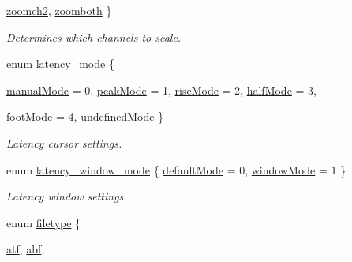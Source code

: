 \begin{DoxyCompactItemize}
\hyperlink{group__stfgen_gga9a792b11c01e9429bfe2acd3e4ef108baef0062d1da678e4771bf559b3dc1e537}{zoomch2}, 
\hyperlink{group__stfgen_gga9a792b11c01e9429bfe2acd3e4ef108ba0c34eab028555c38760abc86b551b6c6}{zoomboth}
 \}
\begin{DoxyCompactList}\small\item\em Determines which channels to scale. \item\end{DoxyCompactList}\item 
enum \hyperlink{group__stfgen_ga738f9934a45a9d2d81cb0a3de0375c99}{latency\_\-mode} \{ \par
\hyperlink{group__stfgen_gga738f9934a45a9d2d81cb0a3de0375c99a38b8edc5f8a706c23b6efd737aada25a}{manualMode} =  0, 
\hyperlink{group__stfgen_gga738f9934a45a9d2d81cb0a3de0375c99a42837a2123b13815fb4ee3c005f2cac0}{peakMode} =  1, 
\hyperlink{group__stfgen_gga738f9934a45a9d2d81cb0a3de0375c99abbb23ece92fe176e5358289e2b14f97e}{riseMode} =  2, 
\hyperlink{group__stfgen_gga738f9934a45a9d2d81cb0a3de0375c99ae23bd76db1d3f2fd5ee275c5dc004283}{halfMode} =  3, 
\par
\hyperlink{group__stfgen_gga738f9934a45a9d2d81cb0a3de0375c99a216dce55e173d3838de785cf0a42d87e}{footMode} =  4, 
\hyperlink{group__stfgen_gga738f9934a45a9d2d81cb0a3de0375c99a871047aafad5c561dbf5a77e80a7b174}{undefinedMode}
 \}
\begin{DoxyCompactList}\small\item\em Latency cursor settings. \item\end{DoxyCompactList}\item 
enum \hyperlink{group__stfgen_gae034ed0eec6bdaba3b23d3b2184f799d}{latency\_\-window\_\-mode} \{ \hyperlink{group__stfgen_ggae034ed0eec6bdaba3b23d3b2184f799da65ce55297aad4c581e70b239864c2a16}{defaultMode} =  0, 
\hyperlink{group__stfgen_ggae034ed0eec6bdaba3b23d3b2184f799daf28fa2b9cdf5e498f1ed689e1d8d1934}{windowMode} =  1
 \}
\begin{DoxyCompactList}\small\item\em Latency window settings. \item\end{DoxyCompactList}\item 
enum \hyperlink{group__stfgen_gae703f7802498ae301ac058b94426900f}{filetype} \{ \par
\hyperlink{group__stfgen_ggae703f7802498ae301ac058b94426900fa0136c00f38aa0ad185d30d7c845f38b5}{atf}, 
\hyperlink{group__stfgen_ggae703f7802498ae301ac058b94426900fa5496504b8584246c4ee5820087f94be2}{abf}, 

\end{DoxyCompactItemize}
